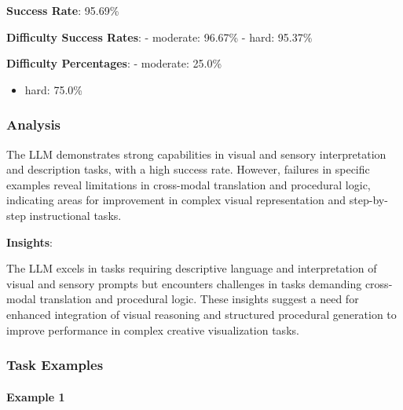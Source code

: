 \documentclass[fleqn,10pt]{wlscirep}
\providecommand{\tightlist}{%
  \setlength{\itemsep}{0pt}\setlength{\parskip}{0pt}}
\begin{document}
\textbf{Success Rate}: 95.69\%

\textbf{Difficulty Success Rates}: - moderate: 96.67\% - hard: 95.37\%

\textbf{Difficulty Percentages}: - moderate: 25.0\%

\begin{itemize}
\tightlist
\item
  hard: 75.0\%
\end{itemize}

\hypertarget{analysis-8}{%
\subsubsection{Analysis}\label{analysis-8}}

The LLM demonstrates strong capabilities in visual and sensory
interpretation and description tasks, with a high success rate. However,
failures in specific examples reveal limitations in cross-modal
translation and procedural logic, indicating areas for improvement in
complex visual representation and step-by-step instructional tasks.

\textbf{Insights}:

The LLM excels in tasks requiring descriptive language and
interpretation of visual and sensory prompts but encounters challenges
in tasks demanding cross-modal translation and procedural logic. These
insights suggest a need for enhanced integration of visual reasoning and
structured procedural generation to improve performance in complex
creative visualization tasks.

\hypertarget{task-examples-8}{%
\subsubsection{Task Examples}\label{task-examples-8}}

\hypertarget{example-1-8}{%
\paragraph{Example 1}\label{example-1-8}}
\end{document}
